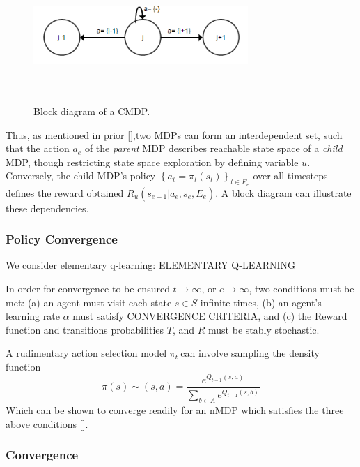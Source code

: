 \documentclass[compsoc,journal,letterpaper,10pt,draftcls,twocolumn]{IEEEtran}
\begin{document}
\begin{figure}
\includegraphics[width=3.20833in,height=1.70208in]{media/image3.png}\\
\caption{\label{fig:figure3}Block diagram of a CMDP.}
\end{figure}

Thus,
as mentioned in prior {[}{]},two MDPs can form an interdependent set,
such that the action \(a_{e}\) of the \emph{parent} MDP describes
reachable state space of a \emph{child} MDP, though restricting state
space exploration by defining variable \(u\). Conversely, the child
MDP's policy
\(\left\{ a_{t} = \pi_{t}(s_{t}) \right\}_{t \in E_{e}}^{\ }\) over all
timesteps defines the reward obtained
\(R_{u}\left( s_{e + 1}|a_{e},s_{e},E_{e} \right)\). A block diagram can
illustrate these dependencies.

\subsubsection{Policy Convergence}\label{policy-convergence}

We consider elementary q-learning: ELEMENTARY Q-LEARNING

In order for convergence to be ensured \(t \rightarrow \infty\), or
\(e \rightarrow \infty\), two conditions must be met: (a) an agent must
visit each state \(s \in S\) infinite times, (b) an agent's learning
rate \(\alpha\) must satisfy CONVERGENCE CRITERIA, and (c) the Reward
function and transitions probabilities \(T\), and \(R\) must be stably
stochastic.

A rudimentary action selection model \(\pi_{t}\ \)can involve sampling
the density function
\begin{equation}
\pi\left( s \right) \sim \left( s, a \right) = \frac{e^{Q_{t - 1}(s, a)}}{\sum_{b \in A}e^{Q_{t - 1}(s, b)}}
\end{equation}
Which can be shown to converge readily for an nMDP which satisfies the
three above conditions {[}{]}.

\subsubsection{Convergence}\label{convergence}
\end{document}
